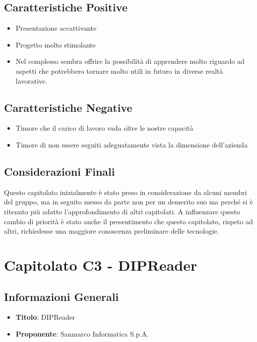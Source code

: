 \documentclass[a4paper,12pt]{article}
\begin{document}
    \subsection{Caratteristiche Positive}
    \begin{itemize}
        \item Presentazione accattivante
        \item Progetto molto stimolante
        \item Nel complesso sembra offrire la possibilità di apprendere molto riguardo ad aspetti che potrebbero tornare molto utili in futuro in diverse realtà lavorative. 
    \end{itemize}
    \subsection{Caratteristiche Negative}
        \begin{itemize}
            \item Timore che il carico di lavoro vada oltre le nostre capacità   
            \item Timore di non essere seguiti adeguatamente vista la dimensione dell'azienda 
        \end{itemize}
    \subsection{Considerazioni Finali}
    Questo capitolato inizialmente è stato preso in considerazione da alcuni membri del gruppo, ma in seguito messo da parte non per un demerito suo ma perché si è ritenuto più adatto l'approfondimento di altri capitolati. A influenzare questo cambio di priorità è stato anche il presentimento che questo capitolato, rispeto ad altri, richiedesse una maggiore conoscenza preliminare delle tecnologie.

    \section{Capitolato C3 - DIPReader} \label{sec:C3}
    \subsection{Informazioni Generali}
        \begin{itemize}
            \item \textbf{Titolo}: DIPReader
            \item \textbf{Proponente}: Sanmarco Informatica S.p.A.
        \end{itemize}
\end{document}

